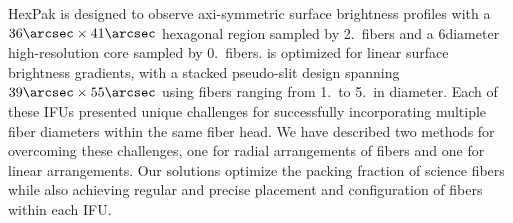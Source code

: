 HexPak is designed to observe axi-symmetric surface brightness profiles with a
$36\arcsec\times41\arcsec$ hexagonal region sampled by 2.\ fibers and a
6\arcsec diameter high-resolution core sampled by 0.\ fibers.  \GP
is optimized for linear surface brightness gradients, with a stacked
pseudo-slit design spanning $39\arcsec\times55\arcsec$ using fibers ranging
from 1.\ to 5.\ in diameter.  Each of these IFUs presented
unique challenges for successfully incorporating multiple fiber diameters
within the same fiber head.  We have described two methods for overcoming
these challenges, one for radial arrangements of fibers and one for linear
arrangements.  Our solutions optimize the packing fraction of science fibers
while also achieving regular and precise placement and configuration of fibers
within each IFU.



